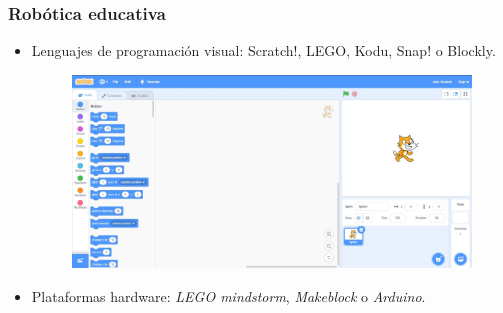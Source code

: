 \documentclass[xcolor={table}]{beamer}
\begin{document}
	\begin{frame}
		\frametitle{Robótica educativa}
		\begin{itemize}
			\item Lenguajes de programación visual: Scratch!, LEGO, Kodu, Snap! o Blockly.
		           \begin{figure}[H]
                    \centering
                    \includegraphics[scale=0.2]{img/scratch.jpg}
                   \label{fig:scratch}
                    \end{figure}
            \item Plataformas hardware: \textit{LEGO mindstorm}, \textit{Makeblock} o \textit{Arduino}.
		\end{itemize}
	\end{frame}
\end{document}
